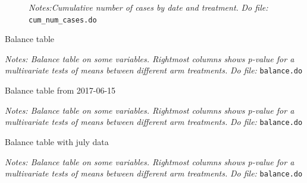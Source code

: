 \documentclass[12pt]{article}
\begin{document}
\begin{figure}[H]
\begin{center}
\begin{subfigure}{0.49\textwidth}
     \end{subfigure}
  \end{center}
        {\footnotesize \textit{Notes:Cumulative number of cases by date and treatment.}}
         {\footnotesize \textit{Do file: } \texttt{cum\_num\_cases.do}}
\end{figure}




\begin{table}[H]
\caption{Balance table}
\begin{center}
\scriptsize{}
\end{center}
 \footnotesize
\textit{Notes: Balance table on some variables. Rightmost columns shows p-value for a multivariate tests of means between different arm treatments.} 
\textit{Do file: } \texttt{balance.do}
\end{table}


\begin{table}[H]
\caption{Balance table from 2017-06-15}
\begin{center}
\scriptsize{}
\end{center}
 \footnotesize
\textit{Notes: Balance table on some variables. Rightmost columns shows p-value for a multivariate tests of means between different arm treatments.} 
\textit{Do file: } \texttt{balance.do}
\end{table}


\begin{table}[H]
\caption{Balance table with july data}
\begin{center}
\scriptsize{}
\end{center}
 \footnotesize
\textit{Notes: Balance table on some variables. Rightmost columns shows p-value for a multivariate tests of means between different arm treatments.} 
\textit{Do file: } \texttt{balance.do}
\end{table}
\end{document}
